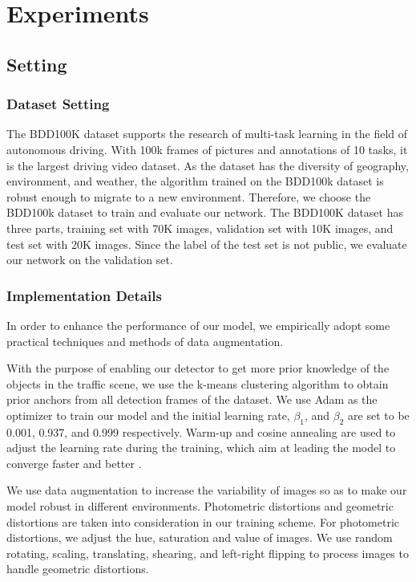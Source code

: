 \documentclass[10pt,twocolumn,letterpaper]{article}
\begin{document}
\section{Experiments}

\subsection{Setting}

\subsubsection{Dataset Setting}
The BDD100K dataset \cite{bdd100k} supports the research of multi-task learning in the field of autonomous driving. With 100k frames of pictures and annotations of 10 tasks, it is the largest driving video dataset. As the dataset has the diversity of geography, environment, and weather, the algorithm trained on the BDD100k dataset is robust enough to migrate to a new environment. Therefore, we choose the BDD100k dataset to train and evaluate our network. The BDD100K dataset has three parts, training set with 70K images, validation set with 10K images, and test set with 20K images. Since the label of the test set is not public, we evaluate our network on the validation set.


\subsubsection{Implementation Details}

In order to enhance the performance of our model, we empirically adopt some practical techniques and methods of data augmentation.

With the purpose of enabling our detector to get more prior knowledge of the objects in the traffic scene, we use the k-means clustering algorithm to obtain prior anchors from all detection frames of the dataset. We use Adam as the optimizer to train our model and the initial learning rate, ${\beta_1}$, and ${\beta_2}$ are set to be 0.001, 0.937, and 0.999 respectively. Warm-up and cosine annealing are used to adjust the learning rate during the training, which aim at leading the model to converge faster and better \cite{warmupandcos}.

We use data augmentation to increase the variability of images so as to make our model robust in different environments. Photometric distortions and geometric distortions are taken into consideration in our training scheme. For photometric distortions, we adjust the hue, saturation and value of images. We use random rotating, scaling, translating, shearing, and left-right flipping to process images to handle geometric distortions.
\end{document}
